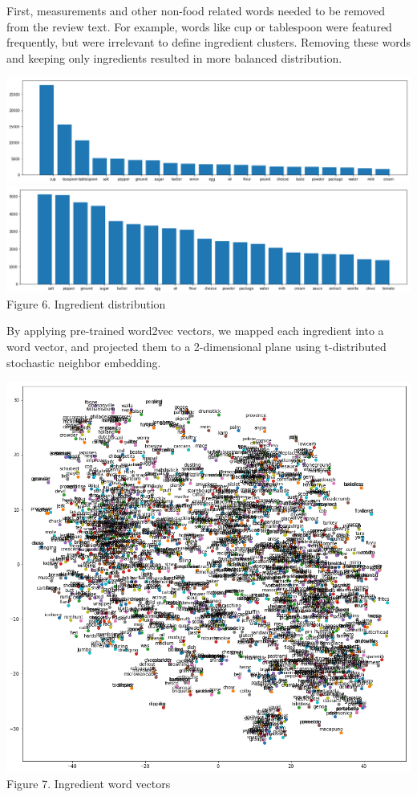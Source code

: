 \documentclass[11pt]{article}
\begin{document}
First, measurements and other non-food related words needed to be removed from the review text. For example, words like cup or tablespoon were featured frequently, but were irrelevant to define ingredient clusters. Removing these words and keeping only ingredients resulted in more balanced distribution.

\vspace{5mm}
\begin{center}
\includegraphics[scale=0.18]{ingredient-before}
\includegraphics[scale=0.18]{ingredient-after}
\label{ingredient-dist} Figure 6. Ingredient distribution
\end{center}
\vspace{5mm}

By applying pre-trained word2vec vectors, we mapped each ingredient into a word vector, and projected them to a 2-dimensional plane using t-distributed stochastic neighbor embedding. 

\vspace{5mm}
\begin{center}
\includegraphics[scale=0.24]{ingredient-tsne}
\label{ingredient-vectors} Figure 7. Ingredient word vectors
\end{center}
\vspace{5mm}
\end{document}
